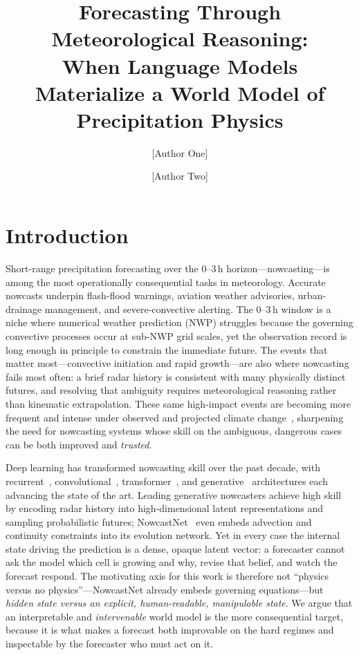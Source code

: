 \documentclass[fleqn,10pt]{wlscirep}
\title{Forecasting Through Meteorological Reasoning:\\
       When Language Models Materialize a World Model of Precipitation Physics}
\author[1,*]{[Author One]}
\author[1]{[Author Two]}
\affil[1]{[Affiliation, Department, City, Country]}
\affil[*]{[corresponding@email.example]}
\begin{document}
\flushbottom
\maketitle
\thispagestyle{empty}

\section*{Introduction}

Short-range precipitation forecasting over the 0--3\,h horizon---nowcasting---is among the most operationally consequential tasks in meteorology.
Accurate nowcasts underpin flash-flood warnings, aviation weather advisories, urban-drainage management, and severe-convective alerting.
The 0--3\,h window is a niche where numerical weather prediction (NWP) struggles because the governing convective processes occur at sub-NWP grid scales, yet the observation record is long enough in principle to constrain the immediate future.
The events that matter most---convective initiation and rapid growth---are also where nowcasting fails most often: a brief radar history is consistent with many physically distinct futures, and resolving that ambiguity requires meteorological reasoning rather than kinematic extrapolation.
These same high-impact events are becoming more frequent and intense under observed and projected climate change~\cite{ipcc2021ar6}, sharpening the need for nowcasting systems whose skill on the ambiguous, dangerous cases can be both improved and \emph{trusted}.

Deep learning has transformed nowcasting skill over the past decade, with recurrent~\cite{shi2015convlstm,shi2017trajgru,wang2017predrnn,wang2018predrnnpp}, convolutional~\cite{ayzel2020rainnet,trebing2021smaatunet}, transformer~\cite{gao2022earthformer,sonderby2020metnet,espeholt2022metnet2}, and generative~\cite{ravuri2021dgmr,zhang2023nowcastnet,leinonen2023ldcast,gao2023prediff,yu2024diffcast,gong2024cascast} architectures each advancing the state of the art.
Leading generative nowcasters achieve high skill by encoding radar history into high-dimensional latent representations and sampling probabilistic futures; NowcastNet~\cite{zhang2023nowcastnet} even embeds advection and continuity constraints into its evolution network.
Yet in every case the internal state driving the prediction is a dense, opaque latent vector: a forecaster cannot ask the model which cell is growing and why, revise that belief, and watch the forecast respond.
The motivating axis for this work is therefore not ``physics versus no physics''---NowcastNet already embeds governing equations---but \emph{hidden state versus an explicit, human-readable, manipulable state}.
We argue that an interpretable and \emph{intervenable} world model is the more consequential target, because it is what makes a forecast both improvable on the hard regimes and inspectable by the forecaster who must act on it.
\end{document}
